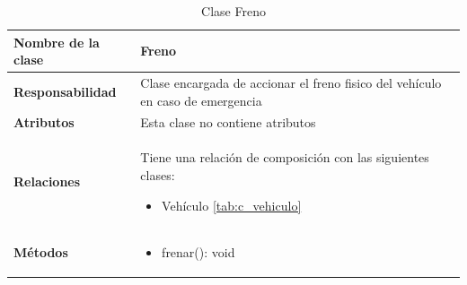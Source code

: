 \begin{table}[h]
\begin{center}
\begin{tabular}{p{} p{11cm}}
\textbf{Nombre de la clase} &  Freno\\ \hline \hline
\textbf{Responsabilidad} &   Clase encargada de accionar el freno fisico del vehículo en caso de emergencia  \\ \hline
\textbf{Atributos} & Esta clase no contiene atributos\\ \hline
\textbf{Relaciones} & \par Tiene una relación de composición con las siguientes clases:
                      \begin{itemize}
                        \item Vehículo \ref{tab:c_vehiculo}
                      \end{itemize}

                      \\ \hline

\textbf{Métodos} &  \begin{itemize}
                      \item frenar(): void
                    \end{itemize}\\ \hline
\end{tabular}
\caption{Clase Freno}
\label{tab:c_freno}
\end{center}
\end{table}








